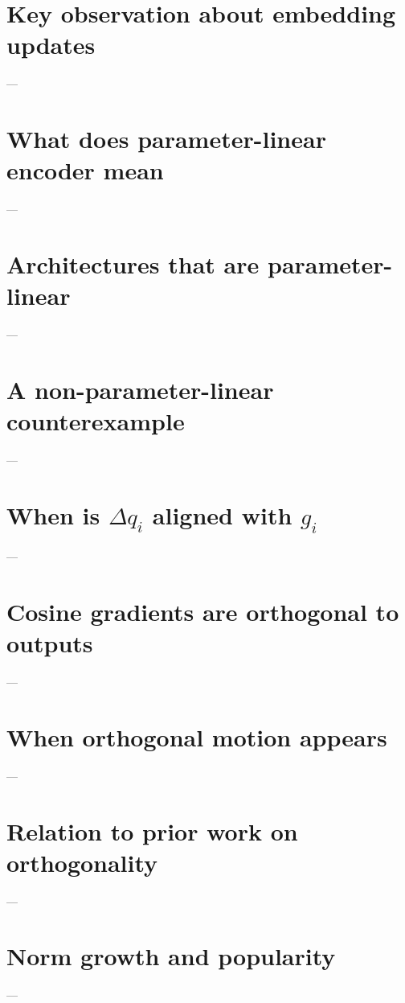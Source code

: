 \section{Key observation about embedding updates}
---

\section{What does parameter-linear encoder mean}
---

\section{Architectures that are parameter-linear}
---

\section{A non-parameter-linear counterexample}
---

\section{When is \(\Delta q_i\) aligned with \(g_i\)}
---

\section{Cosine gradients are orthogonal to outputs}
---

\section{When orthogonal motion appears}
---

\section{Relation to prior work on orthogonality}
---

\section{Norm growth and popularity}
---
